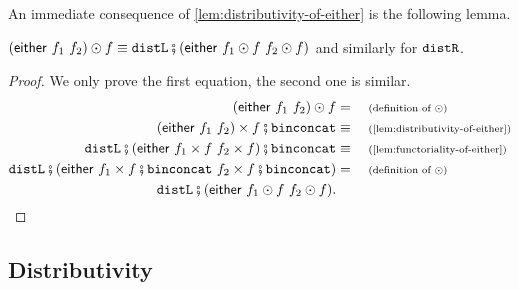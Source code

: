 An immediate consequence of \cref{lem:distributivity-of-either} is the following lemma.
\begin{lemma}\label{lem:distributivity-of-concatenation}
        $(\either {f_1}  {f_2}) \fdot f \equiv \distlterm\comp (\either {f_1 \fdot f} {f_2 \fdot f})$ and similarly for $\mathtt{distR}$.
\end{lemma}
\begin{proof} We only prove the first equation, the second one is similar.
        \begin{align*}
    (\either{f_1}{f_2}) \fdot f  &= \why{definition of $\fdot$} \\
    (\either{f_1}{f_2}) \times f\comp \binconcatterm  \equalbecause{\cref{lem:distributivity-of-either}} \\
    \distlterm\comp (\either {f_1 \times f} {f_2 \times f})\comp \binconcatterm 
     \equalbecause{\cref{lem:functoriality-of-either}} \\
    \distlterm\comp (\either {f_1 \times f\comp\binconcatterm } {f_2 \times f\comp\binconcatterm})  
     &= \why{definition of $\fdot$} \\
    \distlterm\comp (\either {f_1 \fdot f} {f_2 \fdot f}).
    \end{align*}
\end{proof}

\subsection{Distributivity}\label{sec:distributivity}

